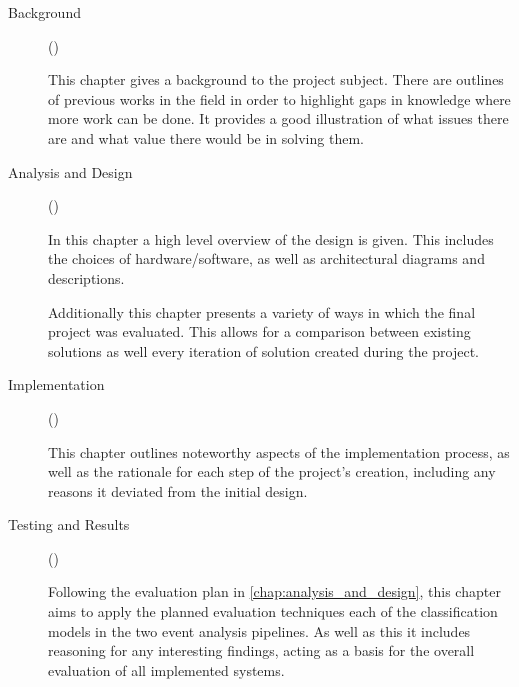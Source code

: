 \begin{description}
      \item[Background] ()

            This chapter gives a background to the project subject. There are outlines of previous works in the field in order to highlight gaps in knowledge where more work can be done. It provides a good illustration of what issues there are and what value there would be in solving them.




      \item[Analysis and Design] ()
      
      In this chapter a high level overview of the design is given. This includes the choices of hardware/software, as well as architectural diagrams and descriptions.

      Additionally this chapter presents a variety of ways in which the final project was evaluated. This allows for a comparison between existing solutions as well every iteration of solution created during the project.

      \item[Implementation] ()

      This chapter outlines noteworthy aspects of the implementation process, as well as the rationale for each step of the project's creation, including any reasons it deviated from the initial design.

      \item[Testing and Results] ()
      
      Following the evaluation plan in \cref{chap:analysis_and_design}, this chapter aims to apply the planned evaluation techniques each of the classification models in the two event analysis pipelines. As well as this it includes reasoning for any interesting findings, acting as a basis for the overall evaluation of all implemented systems.


\end{description}
